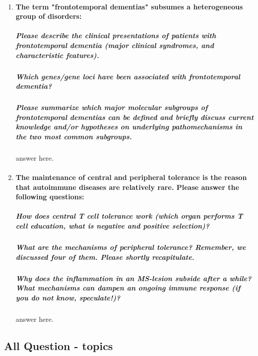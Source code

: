 \documentclass[12pt,article,oneside,a4paper]{memoir}
\begin{document}
\begin{enumerate}
\item \paragraph{The term "frontotemporal dementias" subsumes a heterogeneous group of disorders:}
\subparagraph{Please describe the clinical presentations of patients with frontotemporal dementia (major clinical syndromes, and characteristic features).} \subparagraph{Which genes/gene loci have been associated with frontotemporal dementia?} \subparagraph{Please summarize which major molecular subgroups of frontotemporal dementias can be defined and briefly discuss current knowledge and/or hypotheses on underlying pathomechanisms in the two most common subgroups.} answer here.

\item \paragraph{The maintenance of central and peripheral tolerance is the reason that autoimmune diseases are relatively rare. Please answer the following questions:} \subparagraph{How does central T cell tolerance work (which organ performs T cell education, what is negative and positive selection)?} \subparagraph{What are the mechanisms of peripheral tolerance? Remember, we discussed four of them. Please shortly recapitulate.} \subparagraph{Why does the inflammation in an MS-lesion subside after a while? What mechanisms can dampen an ongoing immune response (if you do not know,
speculate!)?} answer here.

\end{enumerate}

\subsection{All Question - topics}
\end{document}
